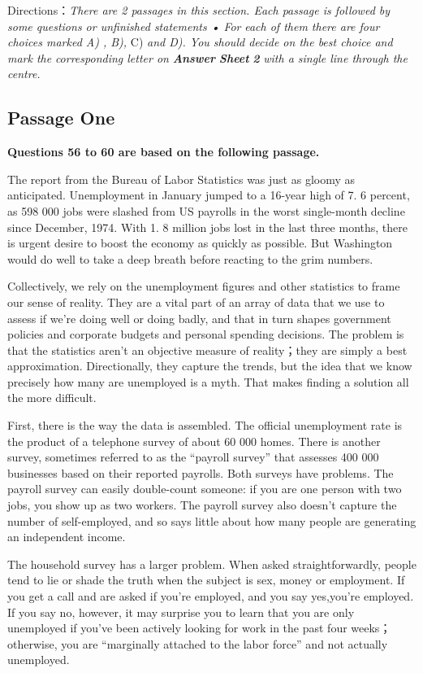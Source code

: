 \documentclass[UTF8,11pt]{ctexart}
\begin{document}
Directions：\textit{There are 2 passages in this section. Each passage is followed by some questions or unfinished statements • For} \textit{each of them there are four choices marked A) , B),} C)\textit{ and D). You should decide on the best choice and mark the} \textit{corresponding letter on}\textbf{\textit{ Answer}} \textbf{\textit{Sheet}} \textbf{\textit{2}}\textit{ with a single line through the centre.}


\subsection*{\textbf{Passage One}}


\textbf{Questions 56 to 60 are based on the following passage.}


The report from the Bureau of Labor Statistics was just as gloomy as anticipated. Unemployment in January jumped to a 16-year high of 7. 6 percent, as 598 000 jobs were slashed from US payrolls in the worst single-month decline since December, 1974. With 1. 8 million jobs lost in the last three months, there is urgent desire to boost the economy as quickly as possible. But Washington would do well to take a deep breath before reacting to the grim numbers.


Collectively, we rely on the unemployment figures and other statistics to frame our sense of reality. They are a vital part of an array of data that we use to assess if we’re doing well or doing badly, and that in turn shapes government policies and corporate budgets and personal spending decisions. The problem is that the statistics aren’t an objective measure of reality；they are simply a best approximation. Directionally, they capture the trends, but the idea that we know precisely how many are unemployed is a myth. That makes finding a solution all the more difficult.


First, there is the way the data is assembled. The official unemployment rate is the product of a telephone survey of about 60 000 homes. There is another survey, sometimes referred to as the “payroll survey” that assesses 400 000 businesses based on their reported payrolls. Both surveys have problems. The payroll survey can easily double-count someone: if you are one person with two jobs, you show up as two workers. The payroll survey also doesn’t capture the number of self-employed, and so says little about how many people are generating an independent income.


The household survey has a larger problem. When asked straightforwardly, people tend to lie or shade the truth when the subject is sex, money or employment. If you get a call and are asked if you’re employed, and you say yes,you’re employed. If you say no, however, it may surprise you to learn that you are only unemployed if you’ve been actively looking for work in the past four weeks；otherwise, you are “marginally attached to the labor force” and not actually unemployed.
\end{document}
